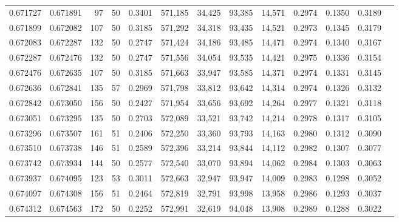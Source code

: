 \begin{tabular}{rrrrrrrrrrrrr}
0.671727 & 0.671891 &    97 &  50 &                                     0.3401 & 571,185 &  34,425 &  93,385 &  14,571 & 0.2974 & 0.1350 & 0.3189 \\
0.671899 & 0.672082 &   107 &  50 &                                     0.3185 & 571,292 &  34,318 &  93,435 &  14,521 & 0.2973 & 0.1345 & 0.3179 \\
0.672083 & 0.672287 &   132 &  50 &                                     0.2747 & 571,424 &  34,186 &  93,485 &  14,471 & 0.2974 & 0.1340 & 0.3167 \\
0.672287 & 0.672476 &   132 &  50 &                                     0.2747 & 571,556 &  34,054 &  93,535 &  14,421 & 0.2975 & 0.1336 & 0.3154 \\
0.672476 & 0.672635 &   107 &  50 &                                     0.3185 & 571,663 &  33,947 &  93,585 &  14,371 & 0.2974 & 0.1331 & 0.3145 \\
0.672636 & 0.672841 &   135 &  57 &                                     0.2969 & 571,798 &  33,812 &  93,642 &  14,314 & 0.2974 & 0.1326 & 0.3132 \\
0.672842 & 0.673050 &   156 &  50 &                                     0.2427 & 571,954 &  33,656 &  93,692 &  14,264 & 0.2977 & 0.1321 & 0.3118 \\
0.673051 & 0.673295 &   135 &  50 &                                     0.2703 & 572,089 &  33,521 &  93,742 &  14,214 & 0.2978 & 0.1317 & 0.3105 \\
0.673296 & 0.673507 &   161 &  51 &                                     0.2406 & 572,250 &  33,360 &  93,793 &  14,163 & 0.2980 & 0.1312 & 0.3090 \\
0.673510 & 0.673738 &   146 &  51 &                                     0.2589 & 572,396 &  33,214 &  93,844 &  14,112 & 0.2982 & 0.1307 & 0.3077 \\
0.673742 & 0.673934 &   144 &  50 &                                     0.2577 & 572,540 &  33,070 &  93,894 &  14,062 & 0.2984 & 0.1303 & 0.3063 \\
0.673937 & 0.674095 &   123 &  53 &                                     0.3011 & 572,663 &  32,947 &  93,947 &  14,009 & 0.2983 & 0.1298 & 0.3052 \\
0.674097 & 0.674308 &   156 &  51 &                                     0.2464 & 572,819 &  32,791 &  93,998 &  13,958 & 0.2986 & 0.1293 & 0.3037 \\
0.674312 & 0.674563 &   172 &  50 &                                     0.2252 & 572,991 &  32,619 &  94,048 &  13,908 & 0.2989 & 0.1288 & 0.3022 \\

\end{tabular}
